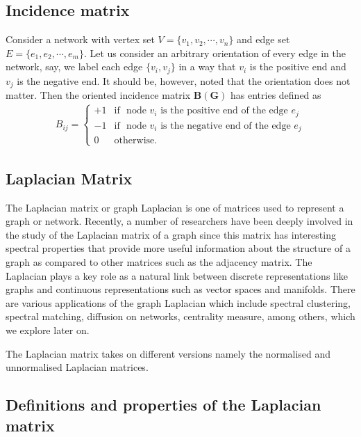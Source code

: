 \documentclass[10pt,a4paper]{article}
\theoremstyle{plain}
\theoremstyle{definition}
\begin{document}
\subsection{Incidence matrix}
	Consider a network with vertex set $V=\{v_1,v_2, \cdots,v_n\}$ and edge set $E =\{e_1,e_2,\cdots,e_m \}$. Let us consider an arbitrary orientation of every edge in the network, say, we label each edge $\{v_i,v_j\}$ in a way that $v_i$ is the positive end and $v_j$ is the negative end. It should be, however, noted that the orientation does not matter. Then the oriented incidence matrix $\mathbf{B(G)}$ has entries defined as
	\begin{eqnarray}
	B_{ij} = \begin{cases} +1 &\mbox{if } \text{ node $v_i$ is the positive end of the edge } e_j \\
	-1 &\mbox{if }  \text{ node $v_i$ is the negative end of the edge } e_j\\
	0 & \text{otherwise}.
	\end{cases}
	\end{eqnarray}

\subsection{Laplacian Matrix}
The Laplacian matrix or graph Laplacian is one of matrices used to represent a graph or network. Recently, a number of researchers have been deeply involved in the study of the Laplacian matrix of a graph since this matrix has interesting spectral properties that provide more useful information about the structure of a graph as compared to other matrices such as the adjacency matrix. The Laplacian plays a key role as a natural link between discrete representations like graphs and continuous representations such as vector spaces and manifolds. 
There are various applications of the graph Laplacian which include spectral clustering, spectral matching, diffusion on networks, centrality measure, among others, which we explore later on. 

The Laplacian matrix takes on different versions namely the normalised and unnormalised Laplacian matrices.

\subsection{Definitions and properties of the Laplacian matrix}
\end{document}
